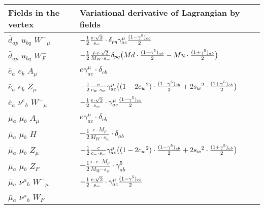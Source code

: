 \begin{center}
\begin{tabular}{|l|l|} \hline
Fields in the vertex & Variational derivative of Lagrangian by fields \\ \hline
$\bar{d}{}_{a p }$ \phantom{-} $u{}_{b q }$ \phantom{-} $W^-{}_{\mu }$ \phantom{-}  &
	$-\frac{1}{2}\frac{ e \cdot\sqrt{2}}{ s_w}\cdot \delta_{p q} \gamma_{a c}^\mu {(1-\gamma^5)_{c b}\over 2} $\\[2mm]
$\bar{d}{}_{a p }$ \phantom{-} $u{}_{b q }$ \phantom{-} $W^-_F{}_{}$ \phantom{-}  &
	$-\frac{1}{2}\frac{ i \cdot e \cdot\sqrt{2}}{ M_W \cdot s_w}\delta_{p q} \big( Md\cdot {(1-\gamma^5)_{a b}\over 2} - Mu\cdot {(1+\gamma^5)_{a b}\over 2} \big)$\\[2mm]
$\bar{e}{}_{a }$ \phantom{-} $e{}_{b }$ \phantom{-} ${A}_{\mu }$ \phantom{-}  &
	$ e\gamma_{a c}^\mu \cdot \delta_{c b} $\\[2mm]
$\bar{e}{}_{a }$ \phantom{-} $e{}_{b }$ \phantom{-} ${Z}_{\mu }$ \phantom{-}  &
	$-\frac{1}{2}\frac{ e}{ c_w \cdot s_w}\gamma_{a c}^\mu \big( (1-2 c_w {}^2)\cdot {(1-\gamma^5)_{c b}\over 2} +2 s_w{}^2 \cdot {(1+\gamma^5)_{c b}\over 2} \big)$\\[2mm]
$\bar{e}{}_{a }$ \phantom{-} $\nu^e{}_{b }$ \phantom{-} $W^-{}_{\mu }$ \phantom{-}  &
	$-\frac{1}{2}\frac{ e \cdot\sqrt{2}}{ s_w}\cdot \gamma_{a c}^\mu {(1-\gamma^5)_{c b}\over 2} $\\[2mm]
$\bar{\mu}{}_{a }$ \phantom{-} $\mu{}_{b }$ \phantom{-} ${A}_{\mu }$ \phantom{-}  &
	$ e\gamma_{a c}^\mu \cdot \delta_{c b} $\\[2mm]
$\bar{\mu}{}_{a }$ \phantom{-} $\mu{}_{b }$ \phantom{-} ${H}_{}$ \phantom{-}  &
	$-\frac{1}{2}\frac{ e \cdot M_{\mu}}{ M_W \cdot s_w}\cdot \delta_{a b} $\\[2mm]
$\bar{\mu}{}_{a }$ \phantom{-} $\mu{}_{b }$ \phantom{-} ${Z}_{\mu }$ \phantom{-}  &
	$-\frac{1}{2}\frac{ e}{ c_w \cdot s_w}\gamma_{a c}^\mu \big( (1-2 c_w {}^2)\cdot {(1-\gamma^5)_{c b}\over 2} +2 s_w{}^2 \cdot {(1+\gamma^5)_{c b}\over 2} \big)$\\[2mm]
$\bar{\mu}{}_{a }$ \phantom{-} $\mu{}_{b }$ \phantom{-} $Z_F{}_{}$ \phantom{-}  &
	$-\frac{1}{2}\frac{ i \cdot e \cdot M_{\mu}}{ M_W \cdot s_w}\cdot \gamma_{a b}^5 $\\[2mm]
$\bar{\mu}{}_{a }$ \phantom{-} $\nu^\mu{}_{b }$ \phantom{-} $W^-{}_{\mu }$ \phantom{-}  &
	$-\frac{1}{2}\frac{ e \cdot\sqrt{2}}{ s_w}\cdot \gamma_{a c}^\mu {(1-\gamma^5)_{c b}\over 2} $\\[2mm]
$\bar{\mu}{}_{a }$ \phantom{-} $\nu^\mu{}_{b }$ \phantom{-} $W^-_F{}_{}$ \phantom{-}  &

\end{tabular}
\end{center}
